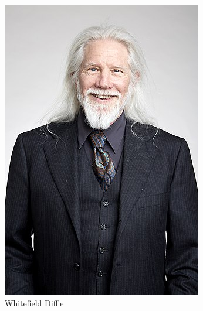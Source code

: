 \documentclass{article}
\begin{document}
\begin{figure}[hb]
  \hfill
  \begin{minipage}[hb]{0.3\textwidth}
    \includegraphics[width=\textwidth]{Diffle.jpg}
    \caption{Whitefield Diffle}
  \end{minipage}
\end{figure}
\end{document}
